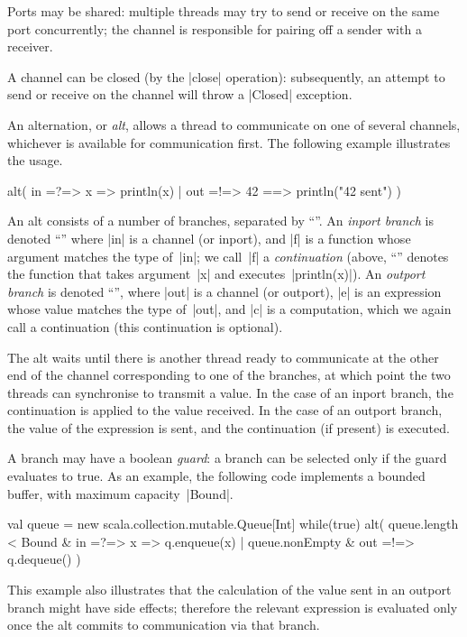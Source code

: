 Ports may be shared: multiple threads may try to send or receive on the same
port concurrently; the channel is responsible for pairing off a sender with a
receiver. 

A channel can be closed (by the |close| operation): subsequently, an attempt
to send or receive on the channel will throw a |Closed| exception.

An alternation, or \emph{alt}, allows a thread to communicate on one of
several channels, whichever is available for communication first.  The
following example illustrates the usage.
%
\begin{scala}
alt(
  in =?=> { x => println(x) }
  | out =!=> { 42 } ==> { println("42 sent") }
)
\end{scala}
%
An alt consists of a number of branches, separated by ``\SCALA{\|}''.  An
\emph{inport branch} is denoted ``'' where |in| is a channel
(or inport), and |f| is a function whose argument matches the type of~|in|; we
call~|f| a \emph{continuation} (above, ``'' denotes the
function that takes argument~|x| and executes~|println(x)|).  An \emph{outport
  branch} is denoted ``'', where |out| is a channel
(or outport), |e| is an expression whose value matches the type of~|out|, and
|c| is a computation, which we again call a continuation (this continuation is
optional).  

The alt waits until there is another thread ready to communicate at the other
end of the channel corresponding to one of the branches, at which point the
two threads can synchronise to transmit a value.  In the case of an inport
branch, the continuation is applied to the value received.  In the case of an
outport branch, the value of the expression is sent, and the continuation (if
present) is executed.

A branch may have a boolean \emph{guard}: a branch can be selected only if the
guard evaluates to true.  As an example, the following code implements a
bounded buffer, with maximum capacity~|Bound|.
%
\begin{scala}
val queue = new scala.collection.mutable.Queue[Int]
while(true){
  alt(
    queue.length < Bound & in =?=> { x => q.enqueue(x) }
    | queue.nonEmpty & out =!=> { q.dequeue() }
  )    
}
\end{scala}
%
This example also illustrates that the calculation of the value sent in an
outport branch might have side effects; therefore the relevant expression is
evaluated only once the alt commits to communication via that branch.

